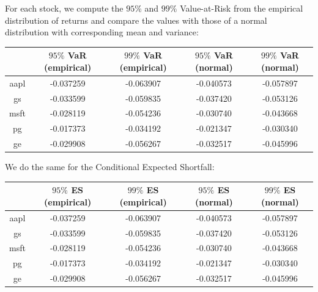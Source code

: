 \documentclass[10pt]{article}
\newenvironment{exercise}[2][Exercise]{\begin{trivlist}
  \item[\hskip \labelsep {\bfseries #1}\hskip \labelsep {\bfseries #2.}]}{\end{trivlist}}
\begin{document}
\begin{exercise}{3}
\begin{figure}[H]
		\end{figure}

	For each stock, we compute the $95\%$ and $99\%$ Value-at-Risk from the empirical distribution of returns and compare the values with those of a normal distribution with corresponding mean and variance:
	
	\begin{table}[h!]
		\centering
 		\begin{tabular}{||c c c c c||} 
 		\hline
		& $95\%$ VaR (empirical) & $99\%$ VaR (empirical)  & $95\%$ VaR (normal) & $99\%$ VaR (normal) \\ [0.5ex] 
 		\hline\hline
 		aapl & -0.037259 & -0.063907 & -0.040573 & -0.057897 \\ 
 		gs & -0.033599 & -0.059835 & -0.037420 & -0.053126 \\
 		msft & -0.028119 & -0.054236 & -0.030740 & -0.043668 \\
 		pg & -0.017373 & -0.034192 & -0.021347 & -0.030340 \\
 		ge & -0.029908 & -0.056267 & -0.032517 & -0.045996 \\ [1ex] 
 \hline
 		\end{tabular}
	\end{table}

	We do the same for the Conditional Expected Shortfall:
	
	\begin{table}[h!]
		\centering
 		\begin{tabular}{||c c c c c||} 
 		\hline
		& $95\%$ ES (empirical) & $99\%$ ES (empirical)  & $95\%$ ES (normal) & $99\%$ ES (normal) \\ [0.5ex] 
 		\hline\hline
 		aapl & -0.037259 & -0.063907 & -0.040573 & -0.057897 \\ 
 		gs & -0.033599 & -0.059835 & -0.037420 & -0.053126 \\
 		msft & -0.028119 & -0.054236 & -0.030740 & -0.043668 \\
 		pg & -0.017373 & -0.034192 & -0.021347 & -0.030340 \\
 		ge & -0.029908 & -0.056267 & -0.032517 & -0.045996 \\ [1ex] 
 \hline
 		\end{tabular}
	\end{table}

\end{exercise}
  
\end{document}
